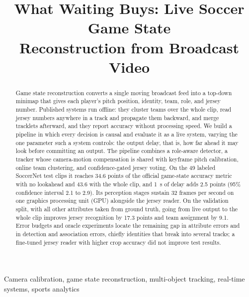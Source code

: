 \documentclass[conference]{IEEEtran}
\begin{document}

\title{What Waiting Buys: Live Soccer Game State\\Reconstruction from Broadcast Video}

\author{
}

\maketitle

\begin{abstract}
Game state reconstruction converts a single moving broadcast feed into a top-down minimap that gives each player's pitch position, identity, team, role, and jersey number. Published systems run offline: they cluster teams over the whole clip, read jersey numbers anywhere in a track and propagate them backward, and merge tracklets afterward, and they report accuracy without processing speed. We build a pipeline in which every decision is causal and evaluate it as a live system, varying the one parameter such a system controls: the output delay, that is, how far ahead it may look before committing an output. The pipeline combines a role-aware detector, a tracker whose camera-motion compensation is shared with keyframe pitch calibration, online team clustering, and confidence-gated jersey voting. On the 49 labeled SoccerNet test clips it reaches 34.6 points of the official game-state accuracy metric with no lookahead and 43.6 with the whole clip, and 1~s of delay adds 2.5 points (95\% confidence interval 2.1 to 2.9). Its perception stages sustain 32 frames per second on one graphics processing unit (GPU) alongside the jersey reader. On the validation split, with all other attributes taken from ground truth, going from live output to the whole clip improves jersey recognition by 17.3 points and team assignment by 9.1. Error budgets and oracle experiments locate the remaining gap in attribute errors and in detection and association errors, chiefly identities that break into several tracks; a fine-tuned jersey reader with higher crop accuracy did not improve test results.
\end{abstract}

\begin{IEEEkeywords}
Camera calibration, game state reconstruction, multi-object tracking, real-time systems, sports analytics
\end{IEEEkeywords}
\end{document}
